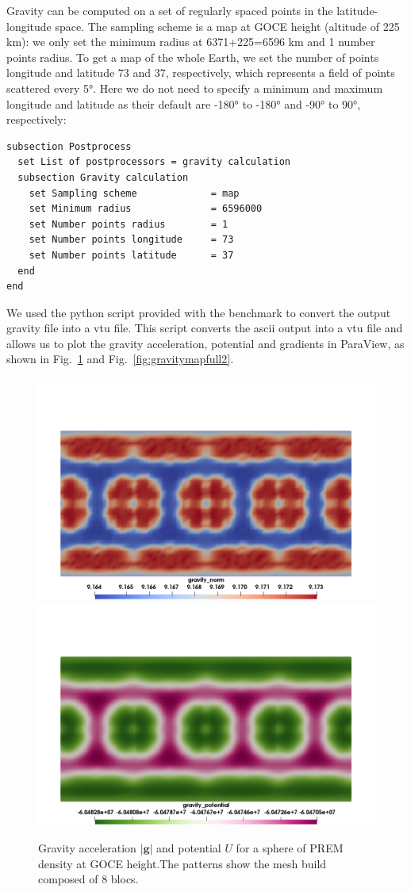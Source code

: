 Gravity can be computed on a set of regularly spaced points in the latitude-longitude space. The sampling scheme is a map at GOCE height (altitude of 225 \si{km}): we only set the minimum radius at 6371+225=6596 \si{km} and 1 number points radius. To get a map of the whole Earth, we set the number of points longitude and latitude 73 and 37, respectively, which represents a field of points scattered every 5\si{\degree}. Here we do not need to specify a minimum and maximum longitude and latitude as their default are -180\si{\degree} to -180\si{\degree} and -90\si{\degree} to 90\si{\degree}, respectively:
\begin{lstlisting}
subsection Postprocess
  set List of postprocessors = gravity calculation   
  subsection Gravity calculation
    set Sampling scheme             = map
    set Minimum radius              = 6596000
    set Number points radius        = 1
    set Number points longitude     = 73
    set Number points latitude      = 37
  end
end
\end{lstlisting}

We used the python script provided with the benchmark to convert the output gravity file into a vtu file. This script converts the ascii output into a vtu file and allows us to plot the gravity acceleration, potential and gradients in ParaView, as shown in Fig.~\ref{fig:gravitymapfull} and Fig.~\ref{fig:gravitymapfull2}. 

\begin{figure}[h!]
\centering
\includegraphics[width=0.48\linewidth]{../../benchmarks/gravity_prem/doc/prem_g_map.png}
\includegraphics[width=0.48\linewidth]{../../benchmarks/gravity_prem/doc/prem_U_map.png}
\caption{Gravity acceleration $|{\mathbf g}|$ and potential $U$  for a sphere of PREM density at GOCE height.The patterns show the mesh build composed of 8 blocs.}
\label{fig:gravitymapfull}
\end{figure}

